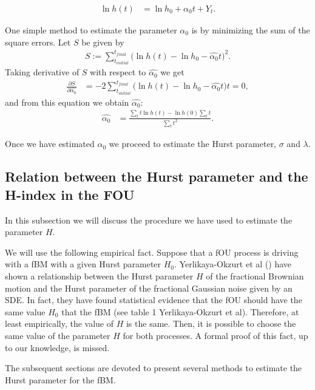 \documentclass[smallextended]{svjour3}
\begin{document}
\begin{align}
\ln h(t)&=\ln h_0+\alpha_0t+Y_t. \label{mod-ln}
\end{align}

One simple method to estimate the parameter $\alpha_0$ is by minimizing the sum
of the square errors.
Let $S$ be given by
\begin{align*}
S:= \sum_{t_{initial}}^{t_{final}} \Big( \ln h(t)-\ln h_0-\widehat{\alpha_0} t
\Big)^2. %
\end{align*}
Taking derivative of $S$ with respect
to $\widehat{\alpha_0}$  we get
\begin{align*}
\frac{\partial S}{\partial \widehat{\alpha_0}}&=
-2\sum_{t_{initial}}^{t_{final}} \Big( \ln h(t)-\ln h_0-\widehat{\alpha_0} t
\Big) t =0, %
\end{align*}
and from this equation we obtain $\widehat{\alpha_0}$:
\begin{align}
\widehat{\alpha_0} &= \frac{\sum_{t} t\ln h(t) - \ln h(0)\sum_{t} t}{\sum_{t}
t^2}. \label{alpha0}
\end{align}

Once we have estimated $\alpha_0$ we proceed to estimate the Hurst parameter,
$\sigma$ and $\lambda$.

\subsection{Relation between the Hurst parameter and the H-index in the FOU}

        In this subsection we will discuss the procedure we have used to
    estimate the parameter $H$.

        We will use the following empirical fact. Suppose that a fOU process is
    driving with a fBM with a given Hurst parameter $H_0$.  Yerlikaya-Okzurt
    et al (\cite{ye-etal})  have shown a relationship between the Hurst
    parameter $H$ of the fractional Brownian motion and the Hurst parameter
    of the fractional Gaussian noise given by an SDE. In fact, they have
    found statistical evidence that the fOU should have the same value $H_0$
    that the fBM (see table 1 Yerlikaya-Okzurt et al). Therefore, at least
    empirically, the value of $H$ is the same. Then, it is possible to
    choose the same value of the parameter $H$ for both processes.  A formal
    proof of this fact, up to our knowledge, is missed.


        The subsequent sections are devoted to present several methods to
    estimate the Hurst parameter for the fBM.
\end{document}
